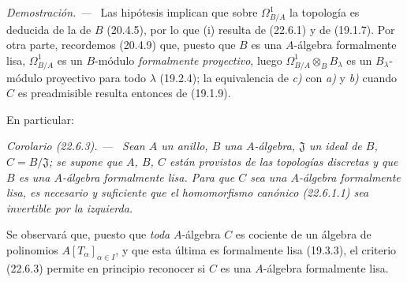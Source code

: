 \documentclass[10pt,oneside]{book}
\makeatletter
\newcommand{\setmanualcurrentlabel}[1]{\def\@currentlabel{#1}}
\newenvironment{corollary}[1][]{%
  \setmanualcurrentlabel{#1}\par\medskip\noindent\itshape Corolario (#1). ---\ }{\par}
\newenvironment{proof}{%
  \par\medskip\noindent\textit{Demostración. ---\ }}{\par}
\makeatother
\begin{document}
\begin{proof}
Las hipótesis implican que sobre $\Omega^1_{B/A}$ la topología es deducida de
la de $B$ (20.4.5), por lo que (i) resulta de (22.6.1) y de (19.1.7). Por otra
parte, recordemos (20.4.9) que, puesto que $B$ es una $A$-álgebra formalmente
lisa, $\Omega^1_{B/A}$ es un $B$-módulo \emph{formalmente proyectivo}, luego
$\Omega^1_{B/A}\otimes_BB_\lambda$ es un $B_\lambda$-módulo proyectivo para
todo $\lambda$ (19.2.4); la equivalencia de \emph{c)} con \emph{a)} y \emph{b)} cuando $C$ es
preadmisible resulta entonces de (19.1.9).
\end{proof}

En particular:

\begin{corollary}[22.6.3]
\label{0.22.6.3-es}
Sean $A$ un anillo, $B$ una $A$-álgebra, $\mathfrak J$ un ideal de $B$,
$C=B/\mathfrak J$; se supone que $A$, $B$, $C$ están provistos de las topologías discretas
y que $B$ es una $A$-álgebra formalmente lisa. Para que $C$ sea una
$A$-álgebra formalmente lisa, es necesario y suficiente que el homomorfismo
canónico \textup{(22.6.1.1)} sea invertible por la izquierda.
\end{corollary}

Se observará que, puesto que \emph{toda} $A$-álgebra $C$ es cociente de un álgebra de
polinomios $A[T_\alpha]_{\alpha\in I}$, y que esta última es formalmente
lisa (19.3.3), el criterio (22.6.3) permite en principio reconocer si $C$
es una $A$-álgebra formalmente lisa.
\end{document}
